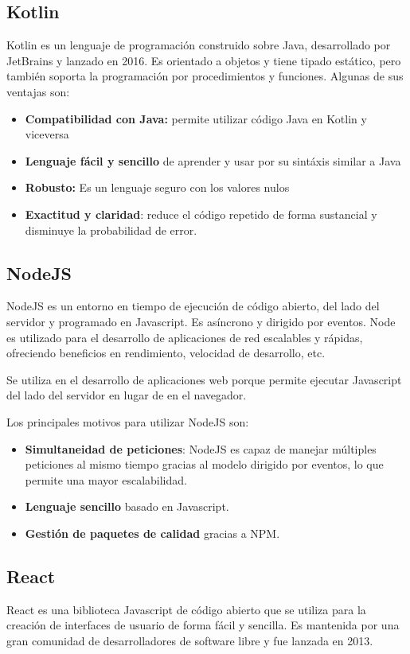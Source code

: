 \subsection{Kotlin}
Kotlin es un lenguaje de programación construido sobre Java, desarrollado por JetBrains y lanzado en 2016.
Es orientado a objetos y tiene tipado estático, pero también soporta la programación por procedimientos y funciones. 
\newpage
Algunas de sus ventajas son:
\begin{itemize}
\item \textbf{Compatibilidad con Java:} permite utilizar código Java en Kotlin y viceversa
\item \textbf{Lenguaje fácil y sencillo} de aprender y usar por su sintáxis similar a Java
\item \textbf{Robusto:} Es un lenguaje seguro con los valores nulos 
\item \textbf{Exactitud y claridad}: reduce el código repetido de forma sustancial y disminuye la probabilidad de error.

\end{itemize}


\subsection{NodeJS}
NodeJS es un entorno en tiempo de ejecución de código abierto, del lado del servidor y programado en Javascript. 
Es asíncrono y dirigido por eventos. Node es utilizado para el desarrollo de aplicaciones de red escalables y rápidas, ofreciendo beneficios
en rendimiento, velocidad de desarrollo, etc. 

Se utiliza en el desarrollo de aplicaciones web porque permite ejecutar Javascript del lado del servidor en lugar de en el navegador. 

Los principales motivos para utilizar NodeJS son:
\begin{itemize}
    \item \textbf{Simultaneidad de peticiones}: NodeJS es capaz de manejar múltiples peticiones al mismo tiempo gracias al modelo dirigido por eventos, 
    lo que permite una mayor escalabilidad.
    \item \textbf{Lenguaje sencillo} basado en Javascript.
    \item \textbf{Gestión de paquetes de calidad} gracias a NPM.
\end{itemize}


\subsection{React}
React es una biblioteca Javascript de código abierto que se utiliza para la creación de interfaces de usuario de forma fácil y sencilla.
Es mantenida por una gran comunidad de desarrolladores de software libre y fue lanzada en 2013. 

